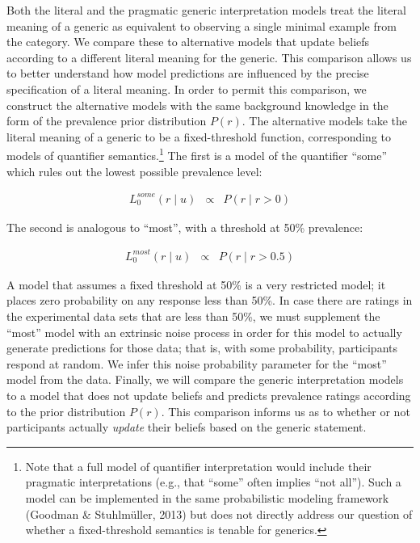\documentclass[floatsintext,doc]{apa6}
\let\rmarkdownfootnote\footnote%
\def\footnote{\protect\rmarkdownfootnote}
\begin{document}
Both the literal and the pragmatic generic interpretation models treat the literal meaning of a generic as equivalent to observing a single minimal example from the category.
We compare these to alternative models that update beliefs according to a different literal meaning for the generic.
This comparison allows us to better understand how model predictions are influenced by the precise specification of a literal meaning.
In order to permit this comparison, we construct the alternative models with the same background knowledge in the form of the prevalence prior distribution \(P(r)\).
The alternative models take the literal meaning of a generic to be a fixed-threshold function, corresponding to models of quantifier semantics.\footnote{Note that a full model of quantifier interpretation would include their pragmatic interpretations (e.g., that \enquote{some} often implies \enquote{not all}). Such a model can be implemented in the same probabilistic modeling framework (Goodman \& Stuhlmüller, 2013) but does not directly address our question of whether a fixed-threshold semantics is tenable for generics.}
The first is a model of the quantifier \enquote{some} which rules out the lowest possible prevalence level:

\begin{eqnarray}
L_0^{some}(r \mid u) &\propto&  P(r \mid r > 0)  \label{eq:someModel}
\end{eqnarray}

The second is analogous to \enquote{most}, with a threshold at 50\% prevalence:

\begin{eqnarray}
L_0^{most}(r \mid u) &\propto&  P(r \mid r > 0.5)  \label{eq:mostModel}
\end{eqnarray}

A model that assumes a fixed threshold at 50\% is a very restricted model; it places zero probability on any response less than 50\%.
In case there are ratings in the experimental data sets that are less than 50\%, we must supplement the \enquote{most} model with an extrinsic noise process in order for this model to actually generate predictions for those data; that is, with some probability, participants respond at random.
We infer this noise probability parameter for the \enquote{most} model from the data.
Finally, we will compare the generic interpretation models to a model that does not update beliefs and predicts prevalence ratings according to the prior distribution \(P(r)\).
This comparison informs us as to whether or not participants actually \emph{update} their beliefs based on the generic statement.
\end{document}
